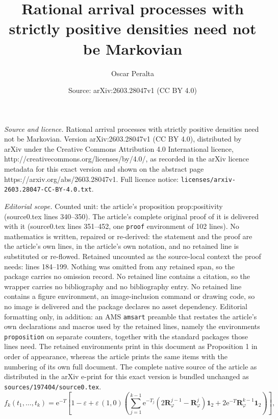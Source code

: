 \documentclass[10pt,a4paper]{amsart}
\title{Rational arrival processes with strictly positive densities need not be Markovian}
\author{Oscar Peralta}
\date{Source: arXiv:2603.28047v1 (CC BY 4.0)}
\newcommand{\e}{\mathrm{e}}
\begin{document}
\maketitle

\noindent\emph{Source and licence.} Rational arrival processes with strictly positive densities need not be Markovian. Version arXiv:2603.28047v1 (CC BY 4.0), distributed by arXiv under the Creative Commons Attribution 4.0 International licence, http://creativecommons.org/licenses/by/4.0/, as recorded in the arXiv licence metadata for this exact version and shown on the abstract page https://arxiv.org/abs/2603.28047v1. Full licence notice: \texttt{licenses/arxiv-2603.28047-CC-BY-4.0.txt}.\par\smallskip

\noindent\textit{Editorial scope.} Counted unit: the article's proposition prop:positivity (source0.tex lines 340--350). The article's complete original proof of it is delivered with it (source0.tex lines 351--452, one \texttt{proof} environment of 102 lines). No mathematics is written, repaired or re-derived: the statement and the proof are the article's own lines, in the article's own notation, and no retained line is substituted or re-flowed.  Retained uncounted as the source-local context the proof needs: lines 184--199.  Nothing was omitted from any retained span, so the package carries no omission record.  No retained line contains a citation, so the wrapper carries no bibliography and no bibliography entry.  No retained line contains a figure environment, an image-inclusion command or drawing code, so no image is delivered and the package declares no asset dependency.  Editorial formatting only, in addition: an AMS \texttt{amsart} preamble that restates the article's own declarations and macros used by the retained lines, namely the environments \texttt{proposition} on separate counters, together with the standard packages those lines need.  The retained environments print in this document as Proposition 1 in order of appearance, whereas the article prints the same items with the numbering of its own full document.  The complete native source of the article as distributed in the arXiv e-print for this exact version is bundled unchanged as \texttt{sources/197404/source0.tex}.
\begin{equation}\label{eq:density-formula}
f_k(t_1,\dots,t_k)
=
\e^{-T}
\left[
1-\varepsilon
+
\varepsilon\,(1,0)
\left(
\sum_{j=1}^{k-1}
\e^{-T_j}(2\bm{R}_\varphi^{j-1}-\bm{R}_\varphi^j)\bm{1}_2
+
2\e^{-T}\bm{R}_\varphi^{k-1}\bm{1}_2
\right)
\right],
\end{equation}
\end{document}
